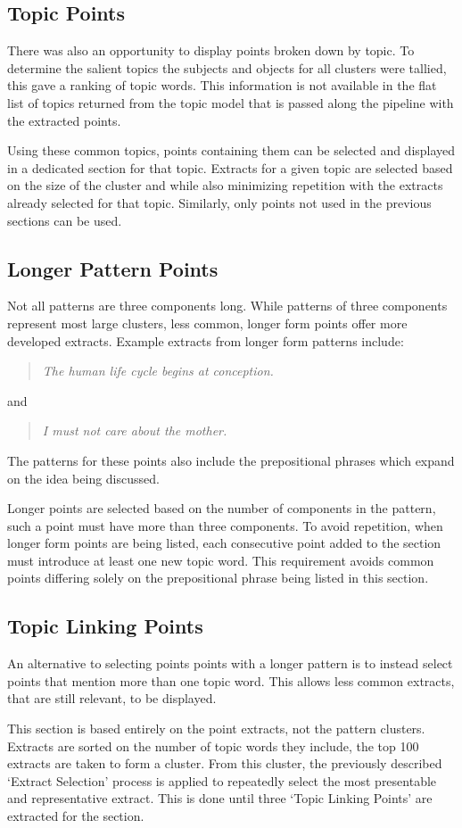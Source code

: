     \subsection{Topic Points}
      There was also an opportunity to display points broken down by topic. To determine the salient topics the subjects and objects for all clusters were tallied, this gave a ranking of topic words. This information is not available in the flat list of topics returned from the topic model that is passed along the pipeline with the extracted points.

      Using these common topics, points containing them can be selected and displayed in a dedicated section for that topic. Extracts for a given topic are selected based on the size of the cluster and while also minimizing repetition with the extracts already selected for that topic. Similarly, only points not used in the previous sections can be used.

    \subsection{Longer Pattern Points}
    Not all patterns are three components long. While patterns of three components represent most large clusters, less common, longer form points offer more developed extracts. Example extracts from longer form patterns include: \blockquote{\textit{The human life cycle begins at conception.}} and \blockquote{\textit{I must not care about the mother.}}. The patterns for these points also include the prepositional phrases which expand on the idea being discussed.

      Longer points are selected based on the number of components in the pattern, such a point must have more than three components. To avoid repetition, when longer form points are being listed, each consecutive point added to the section must introduce at least one new topic word. This requirement avoids common points differing solely on the prepositional phrase being listed in this section.

    \subsection{Topic Linking Points}
      An alternative to selecting points points with a longer pattern is to instead select points that mention more than one topic word. This allows less common extracts, that are still relevant, to be displayed.

      This section is based entirely on the point extracts, not the pattern clusters. Extracts are sorted on the number of topic words they include, the top 100 extracts are taken to form a cluster. From this cluster, the previously described `Extract Selection' process is applied to repeatedly select the most presentable and representative extract. This is done until three `Topic Linking Points' are extracted for the section.

